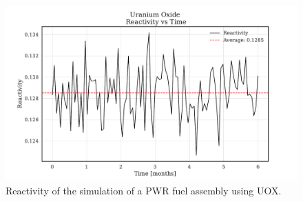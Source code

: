 \begin{figure}
    \centering
    \includegraphics[width=1\textwidth, scale=0.5]{Kap7/Figures_Kap7/Reactivity_vs_Time_UOX.pdf}
    \caption{Reactivity of the simulation of a PWR fuel assembly using UOX.}
    \label{fig:reactivity_uox}
\end{figure}